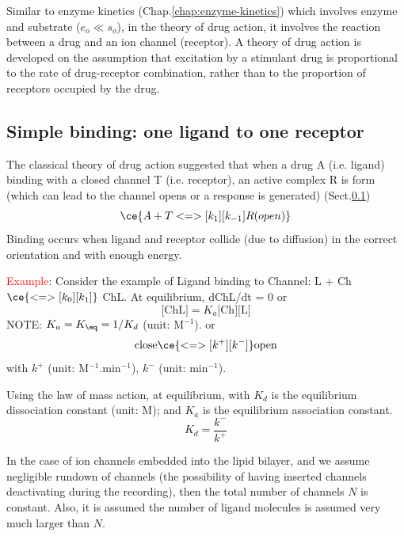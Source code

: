 Similar to enzyme kinetics (Chap.\ref{chap:enzyme-kinetics}) which involves
enzyme and substrate ($e_o\ll s_o$), in the theory of drug action, it involves
the reaction between a drug and an ion channel (receptor).
A theory of drug action is developed on the assumption that excitation by a
stimulant drug is proportional to the rate of drug-receptor combination, rather
than to the proportion of receptors occupied by the drug.

\subsection{Simple binding: one ligand to one receptor}
\label{sec:binding_simple}

The classical theory of drug action suggested that when a drug A (i.e.
ligand) binding with a closed channel T (i.e. receptor), an active complex R is
form (which can lead to the channel opens or a response is generated)
(Sect.\ref{sec:binding_simple})
\begin{equation}
\ce{A + T <=>[k_1][k_{-1}] R(open)}
\end{equation}
Binding occurs when ligand and receptor collide (due to diffusion) in the
correct orientation and with enough energy.

\textcolor{red}{Example}:  Consider the example of Ligand binding to Channel: L
+ Ch $\ce{<=>[k_0][k_1]}$ ChL. At equilibrium, dChL/dt = 0 or
\begin{equation}
\label{eq:ChL}
\text{[ChL]} = K_a \text{[Ch][L]}
\end{equation}
NOTE: $K_a=K_\eq = 1/K_d$ (unit: M$^{-1}$).
or
\begin{equation}
  \label{eq:834}
  \text{close} \ce{<=>[k^+][k^-]} \text{open}
\end{equation}
with $k^+$ (unit: M$^{-1}$.min$^{-1}$), $k^{-}$ (unit: min$^{-1}$).

Using the law of mass action, at equilibrium, with $K_d$ is the equilibrium
dissociation constant (unit: M); and $K_a$ is the equilibrium association
constant.
\begin{equation}
K_d = \frac{k^-}{k^+}
\end{equation}

\begin{mdframed}
In the case of ion channels embedded into the lipid bilayer, and we assume
negligible rundown of channels (the possibility of having inserted channels
deactivating during the recording), then the total number of channels $N$ is
constant. Also, it is assumed the number of ligand molecules is assumed very
much larger than $N$.

\end{mdframed}

